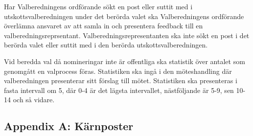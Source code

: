 \documentclass{dsekprotokoll}
\begin{document}
Har Valberedningens ordförande sökt en post eller suttit med i utskottsvalberedningen under det berörda valet ska Valberedningens ordförande överlämna ansvaret av att samla in och presentera
feedback till en valberedningsreprsentant. Valberedningsrepresentanten ska inte sökt en
post i det berörda valet eller suttit med i den berörda utskottsvalberedningen.

Vid beredda val då nomineringar inte är offentliga ska statistik över antalet som genomgått en valprocess föras. Statistiken ska ingå i den möteshandling där valberedningen presenterar sitt förslag till mötet. Statistiken ska presenteras i fasta intervall om 5, där 0-4
är det lägsta intervallet, nästföljande är 5-9, sen 10-14 och så
vidare.

\pagebreak
\subsection*{Appendix A: Kärnposter}
\end{document}
